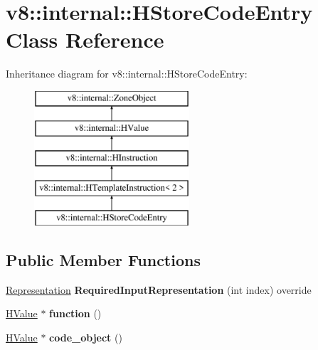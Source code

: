 \hypertarget{classv8_1_1internal_1_1_h_store_code_entry}{}\section{v8\+:\+:internal\+:\+:H\+Store\+Code\+Entry Class Reference}
\label{classv8_1_1internal_1_1_h_store_code_entry}
Inheritance diagram for v8\+:\+:internal\+:\+:H\+Store\+Code\+Entry\+:\begin{figure}[H]
\begin{center}
\leavevmode
\includegraphics[height=5.000000cm]{classv8_1_1internal_1_1_h_store_code_entry}
\end{center}
\end{figure}
\subsection*{Public Member Functions}
\begin{DoxyCompactItemize}
\item 
\hyperlink{classv8_1_1internal_1_1_representation}{Representation} {\bfseries Required\+Input\+Representation} (int index) override\hypertarget{classv8_1_1internal_1_1_h_store_code_entry_a7f6eed0a79d63ca0d0bb2753d2d7a8ed}{}\label{classv8_1_1internal_1_1_h_store_code_entry_a7f6eed0a79d63ca0d0bb2753d2d7a8ed}

\item 
\hyperlink{classv8_1_1internal_1_1_h_value}{H\+Value} $\ast$ {\bfseries function} ()\hypertarget{classv8_1_1internal_1_1_h_store_code_entry_ab63ee873f2aee592a9393ecd12736c9c}{}\label{classv8_1_1internal_1_1_h_store_code_entry_ab63ee873f2aee592a9393ecd12736c9c}

\item 
\hyperlink{classv8_1_1internal_1_1_h_value}{H\+Value} $\ast$ {\bfseries code\+\_\+object} ()\hypertarget{classv8_1_1internal_1_1_h_store_code_entry_a987ab5ada84f286459552db105615d1f}{}\label{classv8_1_1internal_1_1_h_store_code_entry_a987ab5ada84f286459552db105615d1f}

\end{DoxyCompactItemize}
